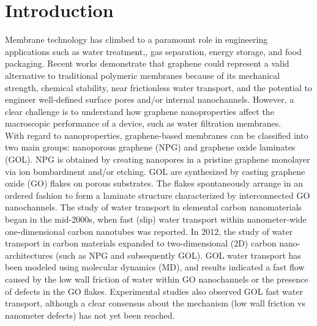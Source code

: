 \justifying

\section{Introduction}
Membrane technology has climbed to a paramount role in engineering applications such as water treatment,\cite{crittenden2012principles,baker2004overview}, gas separation,\cite{ismail2015membrane} energy storage,\cite{park2013renewable} and food packaging.\cite{figoli2010membranes} Recent works demonstrate that graphene could represent a valid alternative to traditional polymeric membranes\cite{li2013ultrathin,celebi2014ultimate} because of its mechanical strength,\cite{lee2008measurement} chemical stability,\cite{li2008processable} near frictionless water transport,\cite{konatham2013simulation,cohen2014water} and the potential to engineer well-defined surface pores and/or internal nanochannels.\cite{russo2012atom,goh2015all,yeh2015origin} However, a clear challenge is to understand how graphene nanoproperties affect the macroscopic performance of a device,\cite{chang2016guidelines} such as water filtration membranes.\\
With regard to nanoproperties, graphene-based membranes can be classified into two main groups: nanoporous graphene (NPG) and graphene oxide laminates (GOL).\cite{huang2015graphene} NPG is obtained by creating nanopores in a pristine graphene monolayer via ion bombardment and/or etching.\cite{o2014selective,o2015nanofiltration,cohen2016multilayer} GOL are synthesized by casting graphene oxide (GO) flakes on porous substrates. The flakes spontaneously arrange in an ordered fashion to form a laminate structure characterized by interconnected GO nanochannels.\cite{hung2014pressure}
The study of water transport in elemental carbon nanomaterials began in the mid-2000s, when fast (slip) water transport within nanometer-wide one-dimensional carbon nanotubes was reported.\cite{majumder2005nanoscale,joseph2008carbon} In 2012, the study of water transport in carbon materials expanded to two-dimensional (2D) carbon nano-architectures (such as NPG and subsequently GOL).\cite{boukhvalov2013origin,cohen2012water} GOL water transport has been modeled using molecular dynamics (MD), and results indicated a fast flow caused by the low wall friction of water within GO nanochannels or the presence of defects in the GO flakes.\cite{nair2012unimpeded,wei2014understanding} Experimental studies also observed GOL fast water transport,\cite{han2013ultrathin,Hu2013} although a clear consensus about the mechanism (low wall friction vs nanometer defects) has not yet been reached.\\
